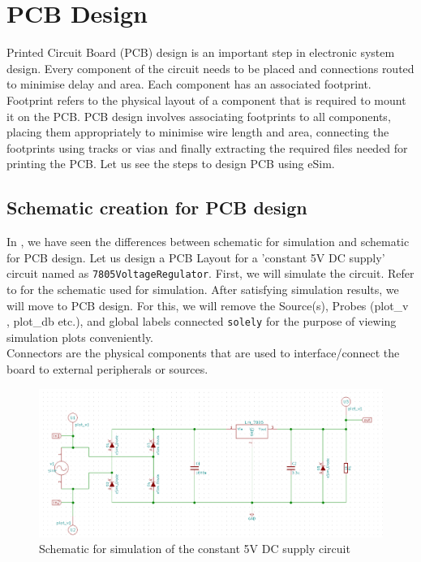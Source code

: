 \chapter{PCB Design}
\thispagestyle{empty}
\label{chap12}

Printed Circuit Board (PCB)  design is an important
step in electronic system design. Every component of the circuit
needs to be placed and connections routed to minimise delay and
area. Each component has an associated footprint. Footprint refers to
the physical layout of a component that is required to mount it on the
PCB. PCB design involves associating footprints to all components, placing them appropriately to
minimise wire length and area, connecting the footprints using
tracks or vias and finally extracting the required files needed for
printing the PCB. Let us see the steps to design PCB using eSim. 

\section{Schematic creation for PCB design}
In , we have seen the differences between schematic for
simulation and schematic for PCB design. Let us design a PCB Layout for a 'constant 5V DC supply'  circuit named as \texttt{7805VoltageRegulator}. First, we will simulate the circuit. Refer to  for the schematic used for simulation. After satisfying simulation results, we will move to PCB design. For this, we will remove the Source(s), Probes (plot\_v , plot\_db etc.), and global labels connected \texttt{solely} for the purpose of viewing simulation plots conveniently. \\  Connectors are the physical components that are used to interface/connect the board to external peripherals or sources.

\begin{figure}
\centering
\includegraphics[width=\lgfig]{NGHDL/pcbschinitial.png}
\caption{Schematic for simulation of the constant 5V DC supply circuit}
\label{pcbschfin}
\end{figure}
 
